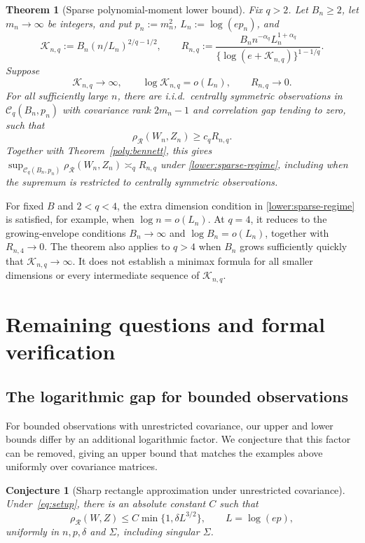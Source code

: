 \documentclass[11pt,letterpaper]{article}
\newtheorem{theorem}{Theorem}
\newtheorem{conjecture}{Conjecture}
\theoremstyle{remark}
\newcommand{\rh}{\rho_{\mathcal R}}
\begin{document}
\begin{theorem}[Sparse polynomial-moment lower bound]\label{lower:sparse}
Fix \(q>2\). Let \(B_n\ge2\), let \(m_n\to\infty\) be integers,
and put \(p_n:=m_n^2\), \(L_n:=\log(ep_n)\), and
\[
 \mathcal K_{n,q}:=B_n(n/L_n)^{2/q-1/2},\qquad
 R_{n,q}:=\frac{B_n n^{-\alpha_q}L_n^{1+\alpha_q}}
                    {\{\log(e+\mathcal K_{n,q})\}^{1-1/q}}.
\]
Suppose
\begin{equation}
 \mathcal K_{n,q}\longrightarrow\infty,\qquad
 \log \mathcal K_{n,q}=o(L_n),\qquad R_{n,q}\longrightarrow0.
 \label{lower:sparse-regime}
\end{equation}
For all sufficiently large \(n\), there are i.i.d.\ centrally symmetric
observations in \(\mathcal C_q(B_n,p_n)\) with covariance rank
\(2m_n-1\) and correlation gap tending to zero, such that
\begin{equation}
 \rh(W_n,Z_n)\ge c_qR_{n,q}.
 \label{lower:sparse-rate}
\end{equation}
Together with Theorem~\ref{poly:bennett}, this gives
\(\sup_{\mathcal C_q(B_n,p_n)}\rh(W_n,Z_n)\asymp_q R_{n,q}\)
under \eqref{lower:sparse-regime}, including when the supremum is
restricted to centrally symmetric observations.
\end{theorem}

For fixed \(B\) and \(2<q<4\), the extra dimension condition in
\eqref{lower:sparse-regime} is satisfied, for example, when
\(\log n=o(L_n)\). At \(q=4\), it reduces to the growing-envelope
conditions \(B_n\to\infty\) and \(\log B_n=o(L_n)\), together
with \(R_{n,4}\to0\). The theorem also applies to \(q>4\) when
\(B_n\) grows sufficiently quickly that \(\mathcal K_{n,q}\to\infty\).
It does not establish a minimax formula for all smaller dimensions
or every intermediate sequence of \(\mathcal K_{n,q}\).

\section{Remaining questions and formal verification}\label{sec:discussion}

\subsection{The logarithmic gap for bounded observations}

For bounded observations with unrestricted covariance, our upper and
lower bounds differ by an additional logarithmic factor. We conjecture
that this factor can be removed, giving an upper bound that matches
the examples above uniformly over covariance matrices.
\begin{conjecture}[Sharp rectangle approximation under unrestricted covariance]
\label{conj:sharp-unrestricted}
Under~\eqref{eq:setup}, there is an absolute constant \(C\) such that
\[
 \rh(W,Z)\le C\min\{1,\delta L^{3/2}\},\qquad L=\log(ep),
\]
uniformly in \(n,p,\delta\) and \(\Sigma\), including singular \(\Sigma\).
\end{conjecture}
\end{document}
